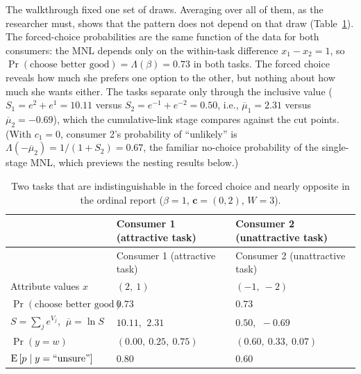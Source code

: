 \documentclass[
  letterpaper,
  DIV=11,
  numbers=noendperiod]{scrartcl}
\theoremstyle{plain}
\theoremstyle{plain}
\theoremstyle{plain}
\theoremstyle{remark}
\begin{document}
The walkthrough fixed one set of draws. Averaging over all of them, as
the researcher must, shows that the pattern does not depend on that draw
(Table~\ref{tbl-toy}). The forced-choice probabilities are the same
function of the data for both consumers: the MNL depends only on the
within-task difference \(x_1 - x_2 = 1\), so
\(\Pr(\text{choose better good}) = \Lambda(\beta) = 0.73\) in both
tasks. The forced choice reveals how much she prefers one option to the
other, but nothing about how much she wants either. The tasks separate
only through the inclusive value (\(S_1 = e^2 + e^1 = 10.11\) versus
\(S_2 = e^{-1} + e^{-2} = 0.50\), i.e., \(\overline{\mu}_1 = 2.31\)
versus \(\overline{\mu}_2 = -0.69\)), which the cumulative-link stage
compares against the cut points. (With \(c_1 = 0\), consumer 2's
probability of ``unlikely'' is
\(\Lambda(-\overline{\mu}_2) = 1/(1+S_2) = 0.67\), the familiar
no-choice probability of the single-stage MNL, which previews the
nesting results below.)

\begin{longtable}[]{@{}
  >{\raggedright\arraybackslash}p{}
  >{\centering\arraybackslash}p{}
  >{\centering\arraybackslash}p{}@{}}
\caption{Two tasks that are indistinguishable in the forced choice and
nearly opposite in the ordinal report (\(\beta = 1\),
\(\mathbf{c} = (0,2)\), \(W = 3\)).}\label{tbl-toy}\tabularnewline
\toprule\noalign{}
\begin{minipage}[b]{\linewidth}\raggedright
\end{minipage} & \begin{minipage}[b]{\linewidth}\centering
Consumer 1 (attractive task)
\end{minipage} & \begin{minipage}[b]{\linewidth}\centering
Consumer 2 (unattractive task)
\end{minipage} \\
\midrule\noalign{}
\endfirsthead
\toprule\noalign{}
\begin{minipage}[b]{\linewidth}\raggedright
\end{minipage} & \begin{minipage}[b]{\linewidth}\centering
Consumer 1 (attractive task)
\end{minipage} & \begin{minipage}[b]{\linewidth}\centering
Consumer 2 (unattractive task)
\end{minipage} \\
\midrule\noalign{}
\endhead
\bottomrule\noalign{}
\endlastfoot
Attribute values \(x\) & \((2,\ 1)\) & \((-1,\ -2)\) \\
\(\Pr(\text{choose better good})\) & \(0.73\) & \(0.73\) \\
\(S = \sum_j e^{V_j}\), \(\ \overline{\mu} = \ln S\) & \(10.11\),
\(\ 2.31\) & \(0.50\), \(\ -0.69\) \\
\(\Pr(y = w)\) & \((0.00,\ 0.25,\ 0.75)\) & \((0.60,\ 0.33,\ 0.07)\) \\
\(\operatorname{E} \left[ p \mid y = \text{“unsure”} \right]\) & \(0.80\) &
\(0.60\) \\
\end{longtable}
\end{document}
